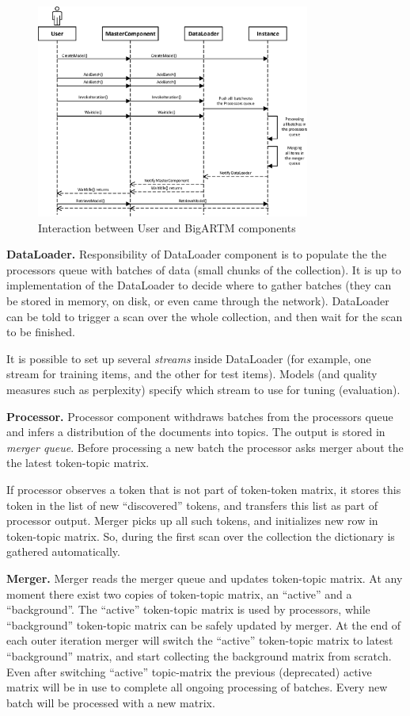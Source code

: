 \documentclass[11pt,a4paper,twoside]{report}
\begin{document}
\begin{figure}[h!]
\begin{centering}
\includegraphics[width=90mm]{diagramm_workflow.eps}
\caption{Interaction between User and BigARTM components}
\label{fig:diagramm_workflow}
\end{centering}
\end{figure}

\textbf{DataLoader.} Responsibility of DataLoader component is to populate the the processors queue
with batches of data (small chunks of the collection).
It is up to implementation of the DataLoader to decide where to gather batches
(they can be stored in memory, on disk, or even came through the network).
DataLoader can be told to trigger a scan over the whole collection,
and then wait for the scan to be finished.

It is possible to set up several \emph{streams} inside DataLoader
(for example, one stream for training items, and the other for test items).
Models (and quality measures such as perplexity) specify which stream to use for tuning (evaluation).

\textbf{Processor.} Processor component withdraws batches from the processors queue
and infers a distribution of the documents into topics.
The output is stored in \emph{merger queue}.
Before processing a new batch the processor asks merger about the the latest token-topic matrix.

If processor observes a token that is not part of token-token matrix, it stores this token in the list of
new ``discovered'' tokens, and transfers this list as part of processor output.
Merger picks up all such tokens, and initializes new row in token-topic matrix.
So, during the first scan over the collection the dictionary is gathered automatically.

\textbf{Merger.}
Merger reads the merger queue and updates token-topic matrix.
At any moment there exist two copies of token-topic matrix,
an ``active'' and a ``background''.
The ``active'' token-topic matrix is used by processors,
while ``background'' token-topic matrix can be safely updated by merger.
At the end of each outer iteration merger will switch the ``active''
token-topic matrix to latest ``background'' matrix,
and start collecting the background matrix from scratch.
Even after switching ``active'' topic-matrix the previous (deprecated) active matrix
will be in use to complete all ongoing processing of batches.
Every new batch will be processed with a new matrix.
\end{document}

